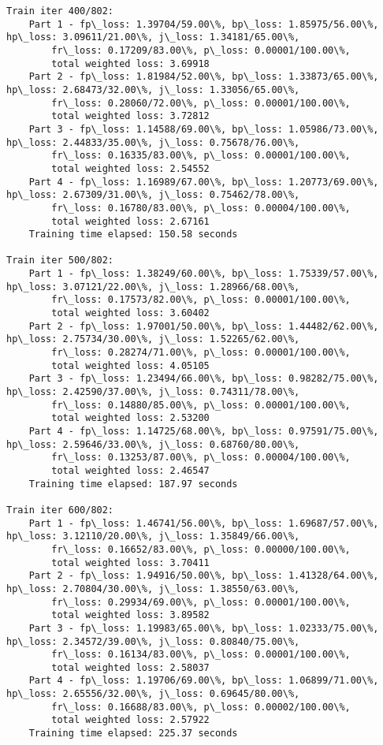 \documentclass[11pt]{article}
\begin{document}
\begin{Verbatim}[commandchars=\\\{\}]
Train iter 400/802:
	Part 1 - fp\_loss: 1.39704/59.00\%, bp\_loss: 1.85975/56.00\%, hp\_loss: 3.09611/21.00\%, j\_loss: 1.34181/65.00\%, 
		fr\_loss: 0.17209/83.00\%, p\_loss: 0.00001/100.00\%, 
		total weighted loss: 3.69918
	Part 2 - fp\_loss: 1.81984/52.00\%, bp\_loss: 1.33873/65.00\%, hp\_loss: 2.68473/32.00\%, j\_loss: 1.33056/65.00\%, 
		fr\_loss: 0.28060/72.00\%, p\_loss: 0.00001/100.00\%, 
		total weighted loss: 3.72812
	Part 3 - fp\_loss: 1.14588/69.00\%, bp\_loss: 1.05986/73.00\%, hp\_loss: 2.44833/35.00\%, j\_loss: 0.75678/76.00\%, 
		fr\_loss: 0.16335/83.00\%, p\_loss: 0.00001/100.00\%, 
		total weighted loss: 2.54552
	Part 4 - fp\_loss: 1.16989/67.00\%, bp\_loss: 1.20773/69.00\%, hp\_loss: 2.67309/31.00\%, j\_loss: 0.75462/78.00\%, 
		fr\_loss: 0.16780/83.00\%, p\_loss: 0.00004/100.00\%, 
		total weighted loss: 2.67161
	Training time elapsed: 150.58 seconds

Train iter 500/802:
	Part 1 - fp\_loss: 1.38249/60.00\%, bp\_loss: 1.75339/57.00\%, hp\_loss: 3.07121/22.00\%, j\_loss: 1.28966/68.00\%, 
		fr\_loss: 0.17573/82.00\%, p\_loss: 0.00001/100.00\%, 
		total weighted loss: 3.60402
	Part 2 - fp\_loss: 1.97001/50.00\%, bp\_loss: 1.44482/62.00\%, hp\_loss: 2.75734/30.00\%, j\_loss: 1.52265/62.00\%, 
		fr\_loss: 0.28274/71.00\%, p\_loss: 0.00001/100.00\%, 
		total weighted loss: 4.05105
	Part 3 - fp\_loss: 1.23494/66.00\%, bp\_loss: 0.98282/75.00\%, hp\_loss: 2.42590/37.00\%, j\_loss: 0.74311/78.00\%, 
		fr\_loss: 0.14880/85.00\%, p\_loss: 0.00001/100.00\%, 
		total weighted loss: 2.53200
	Part 4 - fp\_loss: 1.14725/68.00\%, bp\_loss: 0.97591/75.00\%, hp\_loss: 2.59646/33.00\%, j\_loss: 0.68760/80.00\%, 
		fr\_loss: 0.13253/87.00\%, p\_loss: 0.00004/100.00\%, 
		total weighted loss: 2.46547
	Training time elapsed: 187.97 seconds

Train iter 600/802:
	Part 1 - fp\_loss: 1.46741/56.00\%, bp\_loss: 1.69687/57.00\%, hp\_loss: 3.12110/20.00\%, j\_loss: 1.35849/66.00\%, 
		fr\_loss: 0.16652/83.00\%, p\_loss: 0.00000/100.00\%, 
		total weighted loss: 3.70411
	Part 2 - fp\_loss: 1.94916/50.00\%, bp\_loss: 1.41328/64.00\%, hp\_loss: 2.70804/30.00\%, j\_loss: 1.38550/63.00\%, 
		fr\_loss: 0.29934/69.00\%, p\_loss: 0.00001/100.00\%, 
		total weighted loss: 3.89582
	Part 3 - fp\_loss: 1.19983/65.00\%, bp\_loss: 1.02333/75.00\%, hp\_loss: 2.34572/39.00\%, j\_loss: 0.80840/75.00\%, 
		fr\_loss: 0.16134/83.00\%, p\_loss: 0.00001/100.00\%, 
		total weighted loss: 2.58037
	Part 4 - fp\_loss: 1.19706/69.00\%, bp\_loss: 1.06899/71.00\%, hp\_loss: 2.65556/32.00\%, j\_loss: 0.69645/80.00\%, 
		fr\_loss: 0.16688/83.00\%, p\_loss: 0.00002/100.00\%, 
		total weighted loss: 2.57922
	Training time elapsed: 225.37 seconds


\end{Verbatim}
\end{document}
